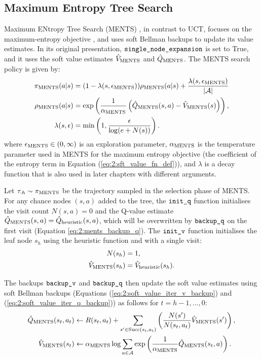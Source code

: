 \subsection{Maximum Entropy Tree Search}
\label{sec:2-4-4-ments}

    Maximum ENtropy Tree Search (MENTS) \cite{ments}, in contrast to UCT, focuses on the maximum-entropy objective , and uses soft Bellman backups to update its value estimates. In its original presentation, ${\textnormal{\texttt{single\_node\_expansion}}}$ is set to True, and it uses the soft value estimates ${\hat{V}_{{\textnormal{MENTS}}}}$ and ${\hat{Q}_{{\textnormal{MENTS}}}}$. The MENTS search policy is given by: 
    \begin{align}
        {\pi_{{\textnormal{MENTS}}}}(a|s) &= 
            (1-{\lambda(s,{\epsilon_{{\textnormal{MENTS}}}})}){\rho_{{\textnormal{MENTS}}}}(a|s) + \frac{{\lambda(s,{\epsilon_{{\textnormal{MENTS}}}})}}{|\mathcal{A}|} \label{eq:2:ments_policy} \\
        {\rho_{{\textnormal{MENTS}}}}(a|s) &= 
            \exp\left(\frac{1}{{\alpha_{{\textnormal{MENTS}}}}}\left({\hat{Q}_{{\textnormal{MENTS}}}}(s,a)-{\hat{V}_{{\textnormal{MENTS}}}}(s)\right)\right), \\
        \lambda(s,\epsilon) &= \min\left(1,\frac{\epsilon}{\log(e+N(s))}\right).
    \end{align}
    where ${\epsilon_{{\textnormal{MENTS}}}} \in (0,\infty)$ is an exploration parameter, ${\alpha_{{\textnormal{MENTS}}}}$ is the temperature parameter used in MENTS for the maximum entropy objective (the coefficient of the entropy term in Equation (\ref{eq:2:sft_value_fn_def})), and $\lambda$ is a decay function that is also used in later chapters with different arguments.

    Let $\tau_{:h}\sim{\pi_{{\textnormal{MENTS}}}}$ be the trajectory sampled in the selection phase of MENTS. For any chance nodes $(s,a)$ added to the tree, the ${\textnormal{\texttt{init\_q}}}$ function initialises the visit count $N(s,a)=0$ and the Q-value estimate ${\hat{Q}_{{\textnormal{MENTS}}}}(s,a)={\hat{Q}_{\textnormal{heuristic}}}(s,a)$, which will be overwritten by ${\textnormal{\texttt{backup\_q}}}$ on the first visit (Equation \ref{eq:2:ments_backup_q}). The ${\textnormal{\texttt{init\_v}}}$ function initialises the leaf node $s_h$ using the heuristic function and with a single visit:
    \begin{align}
        N(s_h) &= 1, \\
        {\hat{V}_{{\textnormal{MENTS}}}}(s_h) &= {\hat{V}_{\textnormal{heuristic}}}(s_h). \label{eq:2:ments_init_v}
    \end{align}

    The backups ${\textnormal{\texttt{backup\_v}}}$ and ${\textnormal{\texttt{backup\_q}}}$ then update the soft value estimates using soft Bellman backups (Equations (\ref{eq:2:soft_value_iter_v_backup}) and (\ref{eq:2:soft_value_iter_q_backup})) as follows for $t=h-1,\ldots,0$:
    \begin{align}
        {\hat{Q}_{{\textnormal{MENTS}}}}(s_t,a_t) &\leftarrow 
            R(s_t,a_t) + \sum_{s'\in{\textnormal{Succ}(s_t,a_t)}} \left( \frac{N(s')}{N(s_t,a_t)} {\hat{V}_{{\textnormal{MENTS}}}}(s') \right), \label{eq:2:ments_backup_q} \\
        {\hat{V}_{{\textnormal{MENTS}}}}(s_t) &\leftarrow 
            {\alpha_{{\textnormal{MENTS}}}} \log \sum_{a\in\mathcal{A}} \exp \left(\frac{1}{{\alpha_{{\textnormal{MENTS}}}}}{\hat{Q}_{{\textnormal{MENTS}}}}(s_t,a) \right). \label{eq:2:ments_backup_v} 
    \end{align}

